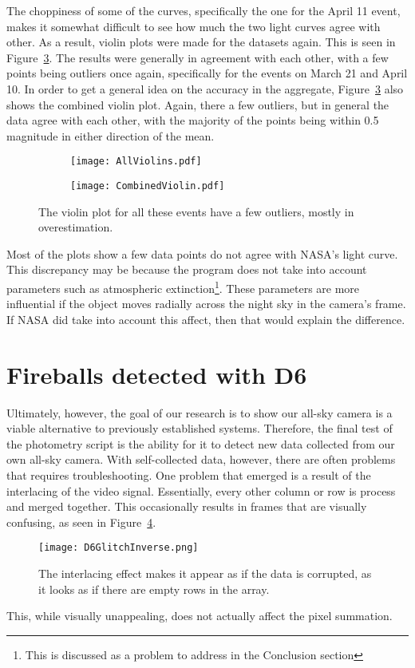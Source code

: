 The choppiness of some of the curves, specifically the one for the April 11 event, makes it somewhat difficult to see how much the two light curves agree with other. As a result, violin plots were made for the datasets again. This is seen in Figure~\ref{fig:twoviolin}. The results were generally in agreement with each other, with a few points being outliers once again, specifically for the events on March 21 and April 10. In order to get a general idea on the accuracy in the aggregate, Figure~\ref{fig:twoviolin} also shows the combined violin plot. Again, there a few outliers, but in general the data agree with each other, with the majority of the points being within 0.5 magnitude in either direction of the mean.
\begin{figure}[ht!]
\centering
\begin{subfigure}{.5\textwidth}
	\centering
	\texttt{[image: AllViolins.pdf]}
	\label{fig:AllViolins}
\end{subfigure}%
\begin{subfigure}{.5\textwidth}
	\centering
	\texttt{[image: CombinedViolin.pdf]}
	\label{fig:CombinedViolin}
\end{subfigure}
\caption{The violin plot for all these events have a few outliers, mostly in overestimation.}
\label{fig:twoviolin}
\end{figure}


Most of the plots show a few data points do not agree with NASA's light curve. This discrepancy may be because the program does not take into account parameters such as atmospheric extinction\footnote{This is discussed as a problem to address in the Conclusion section}. These parameters are more influential if the object moves radially across the night sky in the camera's frame. If NASA did take into account this affect, then that would explain the difference. 

\section{Fireballs detected with D6}

Ultimately, however, the goal of our research is to show our all-sky camera is a viable alternative to previously established systems. Therefore, the final test of the photometry script is the ability for it to detect new data collected from our own all-sky camera. With self-collected data, however, there are often problems that requires troubleshooting. One problem that emerged is a result of the interlacing of the video signal. Essentially, every other column or row is process and merged together. This occasionally results in frames that are visually confusing, as seen in Figure~\ref{fig:D6Glitch}. 
\begin{figure}[ht!]
	\centering
	\texttt{[image: D6GlitchInverse.png]}
	\caption{The interlacing effect makes it appear as if the data is corrupted, as it looks as if there are empty rows in the array.}
	\label{fig:D6Glitch}
\end{figure}
This, while visually unappealing, does not actually affect the pixel summation. 


